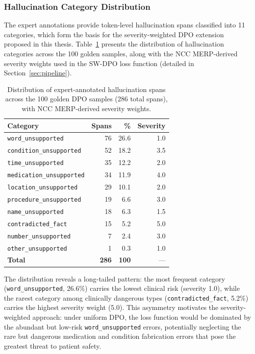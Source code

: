 \documentclass[12pt,a4paper,oneside]{report}
\begin{document}
\subsubsection{Hallucination Category Distribution}

The expert annotations provide token-level hallucination spans classified into 11 categories, which form the basis for the severity-weighted DPO extension proposed in this thesis. Table~\ref{tab:hallucination-categories} presents the distribution of hallucination categories across the 100 golden samples, along with the NCC MERP-derived severity weights used in the SW-DPO loss function (detailed in Section~\ref{sec:pipeline}).

\begin{table}[htbp]
\centering
\caption{Distribution of expert-annotated hallucination spans across the 100 golden DPO samples (286 total spans), with NCC MERP-derived severity weights.}
\label{tab:hallucination-categories}
\begin{tabular}{lrrr}
\toprule
\textbf{Category} & \textbf{Spans} & \textbf{\%} & \textbf{Severity} \\
\midrule
\texttt{word\_unsupported}        & 76 & 26.6 & 1.0 \\
\texttt{condition\_unsupported}   & 52 & 18.2 & 3.5 \\
\texttt{time\_unsupported}        & 35 & 12.2 & 2.0 \\
\texttt{medication\_unsupported}  & 34 & 11.9 & 4.0 \\
\texttt{location\_unsupported}    & 29 & 10.1 & 2.0 \\
\texttt{procedure\_unsupported}   & 19 &  6.6 & 3.0 \\
\texttt{name\_unsupported}        & 18 &  6.3 & 1.5 \\
\texttt{contradicted\_fact}       & 15 &  5.2 & 5.0 \\
\texttt{number\_unsupported}      &  7 &  2.4 & 3.0 \\
\texttt{other\_unsupported}       &  1 &  0.3 & 1.0 \\
\midrule
\textbf{Total}                     & \textbf{286} & \textbf{100} & --- \\
\bottomrule
\end{tabular}
\end{table}

The distribution reveals a long-tailed pattern: the most frequent category (\texttt{word\_unsupported}, 26.6\%) carries the lowest clinical risk (severity 1.0), while the rarest category among clinically dangerous types (\texttt{contradicted\_fact}, 5.2\%) carries the highest severity weight (5.0). This asymmetry motivates the severity-weighted approach: under uniform DPO, the loss function would be dominated by the abundant but low-risk \texttt{word\_unsupported} errors, potentially neglecting the rare but dangerous medication and condition fabrication errors that pose the greatest threat to patient safety.
\end{document}
